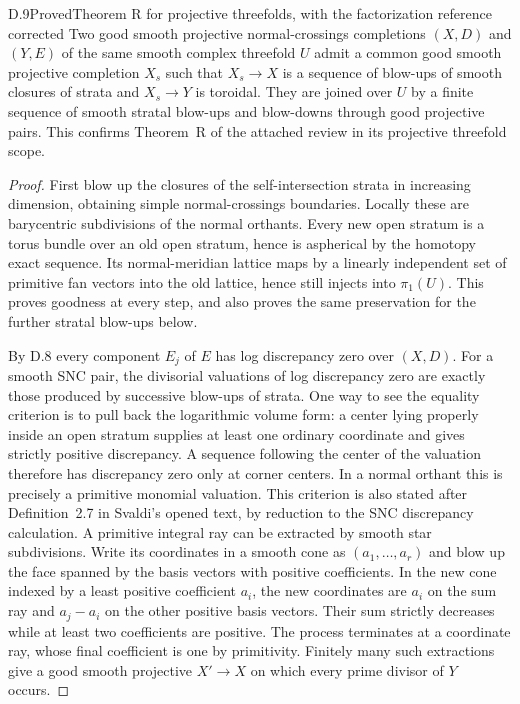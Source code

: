 \begin{result}{D.9}{Proved}{Theorem R for projective threefolds, with the factorization reference corrected}
Two good smooth projective normal-crossings completions $(X,D)$ and $(Y,E)$ of the same smooth complex threefold $U$ admit a common good smooth projective completion $X_s$ such that $X_s\to X$ is a sequence of blow-ups of smooth closures of strata and $X_s\to Y$ is toroidal. They are joined over $U$ by a finite sequence of smooth stratal blow-ups and blow-downs through good projective pairs. This confirms Theorem~R of the attached review in its projective threefold scope.
\end{result}
\begin{proof}
First blow up the closures of the self-intersection strata in increasing dimension, obtaining simple normal-crossings boundaries. Locally these are barycentric subdivisions of the normal orthants. Every new open stratum is a torus bundle over an old open stratum, hence is aspherical by the homotopy exact sequence. Its normal-meridian lattice maps by a linearly independent set of primitive fan vectors into the old lattice, hence still injects into $\pi_1(U)$. This proves goodness at every step, and also proves the same preservation for the further stratal blow-ups below.

By D.8 every component $E_j$ of $E$ has log discrepancy zero over $(X,D)$. For a smooth SNC pair, the divisorial valuations of log discrepancy zero are exactly those produced by successive blow-ups of strata. One way to see the equality criterion is to pull back the logarithmic volume form: a center lying properly inside an open stratum supplies at least one ordinary coordinate and gives strictly positive discrepancy. A sequence following the center of the valuation therefore has discrepancy zero only at corner centers. In a normal orthant this is precisely a primitive monomial valuation. This criterion is also stated after Definition~2.7 in Svaldi's opened text, by reduction to the SNC discrepancy calculation. A primitive integral ray can be extracted by smooth star subdivisions. Write its coordinates in a smooth cone as $(a_1,\ldots,a_r)$ and blow up the face spanned by the basis vectors with positive coefficients. In the new cone indexed by a least positive coefficient $a_i$, the new coordinates are $a_i$ on the sum ray and $a_j-a_i$ on the other positive basis vectors. Their sum strictly decreases while at least two coefficients are positive. The process terminates at a coordinate ray, whose final coefficient is one by primitivity. Finitely many such extractions give a good smooth projective $X'\to X$ on which every prime divisor of $Y$ occurs.


\end{proof}
